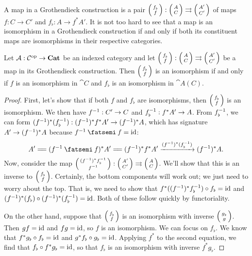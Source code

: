 \documentclass[DynamicalBook]{subfiles}
\begin{document}
A map in a Grothendieck construction is a pair $\lens{f_{\flat}}{f} :
\lens{A}{C} \tto \lens{A'}{C'}$ of maps $f : C \to C'$ and $f_{\flat}: A \to
f^{\ast}A'$. It is not too hard to see that a map is an isomorphism in a Grothendieck
construction if and only if both its constituent maps are isomorphisms in their
respective categories.

\begin{proposition}\label{prop.isomorphism_in_groth_construction}
Let $\mathcal{A} : \mathcal{C}^{\textnormal{op}} \to \textbf{Cat}$ be an indexed category and let $\lens{f_{\flat}}{f} :
\lens{A}{C} \tto \lens{A'}{C'}$ be a map in its Grothendieck construction. Then
$\lens{f_{\flat}}{f}$ is an isomorphism if and only if $f$ is an isomorphism in
$\cat{C}$ and $f_{\flat}$ is an isomorphism in $\cat{A}(C)$.
\end{proposition}
\begin{proof}
First, let's show that if both $f$ and $f_{\flat}$ are isomorphisms, then
$\lens{f_{\flat}}{f}$ is an isomorphism. We then have $f^{-1} : C' \to C$ and
$f_{\flat}^{-1} : f^{\ast}A' \to A$. From $f_{\flat}^{-1}$, we can form
$(f^{-1})^{\ast} (f_{\flat}^{-1}) : (f^{-1})^{\ast}f^{\ast} A' \to
(f^{-1})^{\ast}A$, which has signature $A' \to (f^{-1})^{\ast} A$ because $f\inv \then f = \id$:
$$A' \xequals{\,} (f\inv \then f)^{\ast} A' \xequals{\,}
(f\inv)^{\ast} f^{\ast} A' \xto{(f\inv)^{\ast} (f_{\flat}\inv)} (f\inv)^{\ast} A.$$
Now, consider the map $\lens{(f\inv)^{\ast}f_{\flat}\inv}{f\inv} : \lens{A'}{C'}
\tto \lens{A}{C}$. We'll show that this is an
inverse to $\lens{f_{\flat}}{f}$. Certainly, the bottom components will work
out; we just need to worry about the top. That is, we need to show that
$f^{\ast}((f^{-1})^{\ast} f_{\flat}^{-1}) \circ f_{\flat} = \mathrm{id}$ and
$(f^{-1})^{\ast}(f_{\flat}) \circ (f^{-1})^{\ast}(f_{\flat}^{-1}) = \mathrm{id}$. Both of
these follow quickly by functoriality.

On the other hand, suppose that $\lens{f_{\flat}}{f}$ is an isomorphism with
inverse $\lens{g_{\flat}}{g}$. Then $gf = \mathrm{id}$ and $fg = \mathrm{id}$, so $f$ is an
isomorphism. We can focus on $f_{\flat}$. We know that $f^{\ast}g_{\flat} \circ
f_{\flat} = \mathrm{id}$ and $g^{\ast}f_{\flat} \circ g_{\flat} = \mathrm{id}$. Applying
$f^{\ast}$ to the second equation, we find that $f_{\flat} \circ
f^{\ast}g_{\flat} = \mathrm{id}$, so that $f_{\flat}$ is an isomorphism with inverse $f^{\ast}g_{\flat}$.
\end{proof}  

\iffalse
\begin{remark}
  \cref{prop.isomorphism_in_groth_construction} gives a general solution to
  \cref{ex.isomorphism_in_category_of_charts}, since the category of charts is a
  Grothendieck construction.
\end{remark}
\fi
\end{document}
